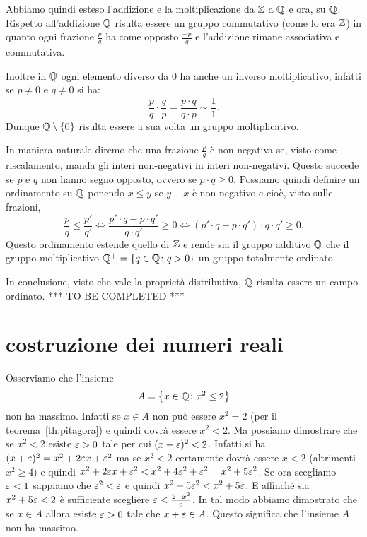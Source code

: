 Abbiamo quindi esteso l'addizione e la moltiplicazione da ${\mathbb Z}$ a ${\mathbb Q}$
e ora, su ${\mathbb Q}$.
Rispetto all'addizione ${\mathbb Q}$ risulta essere un gruppo commutativo (come lo era ${\mathbb Z}$)
in quanto ogni frazione $\frac{p}{q}$ ha come opposto $\frac{-p}{q}$ 
e l'addizione rimane associativa e commutativa.

Inoltre in ${\mathbb Q}$ ogni elemento diverso da $0$
ha anche un inverso moltiplicativo, infatti se $p\neq 0$ e $q\neq 0$ si ha:
\[
 \frac{p}{q}\cdot \frac{q}{p} = \frac{p\cdot q}{q\cdot p} \sim \frac{1}{1}.  
\]
Dunque ${\mathbb Q}\setminus{\left\{ 0 \right\}}$ risulta essere a sua volta un gruppo 
moltiplicativo.

In maniera naturale diremo che una frazione $\frac{p}{q}$ è non-negativa 
se, visto come riscalamento, manda gli interi non-negativi in interi non-negativi. 
Questo succede se $p$ e $q$ non hanno segno opposto, ovvero se $p\cdot q\ge 0$.
Possiamo quindi definire un ordinamento su ${\mathbb Q}$ 
ponendo $x\le y$ se $y-x$ è non-negativo e cioè, visto sulle frazioni,
\[
 \frac{p}{q} \le \frac{p'}{q'} \iff \frac{p'\cdot q-p\cdot q'}{q\cdot q'}\ge 0 
 \iff (p'\cdot q-p\cdot q')\cdot q\cdot q' \ge 0. 
\]
Questo ordinamento estende quello di ${\mathbb Z}$ e rende sia il gruppo additivo ${\mathbb Q}$
che il gruppo moltiplicativo ${\mathbb Q}^+ = {\left\{ q\in {\mathbb Q}\colon q>0 \right\}}$
un gruppo totalmente ordinato. 

In conclusione, visto che vale la proprietà distributiva,  
${\mathbb Q}$ risulta essere un campo ordinato. 
*** TO BE COMPLETED ***


\section{costruzione dei numeri reali}
\label{sec:costruzione_reali}

Osserviamo che l'insieme 
\[
 A = {\left\{ x\in {\mathbb Q} \colon x^2 \le 2 \right\}}  
\]
non ha massimo. 
Infatti se $x\in A$ non può essere $x^2=2$ (per il teorema~\ref{th:pitagora})
e quindi dovrà essere $x^2<2$. 
Ma possiamo dimostrare che se $x^2<2$ esiste $\varepsilon>0$ tale per cui $(x+\varepsilon)^2<2$. 
Infatti si ha $(x+\varepsilon)^2 = x^2 + 2\varepsilon x + \varepsilon^2$
ma se $x^2<2$ certamente dovrà essere $x<2$ (altrimenti $x^2\ge 4$)
e quindi $x^2+2\varepsilon x+\varepsilon^2 < x^2+ 4\varepsilon^2+\varepsilon^2 = x^2+5\varepsilon^2$.
Se ora scegliamo $\varepsilon<1$ sappiamo che $\varepsilon^2<\varepsilon$ 
e quindi $x^2+5\varepsilon^2 < x^2 + 5\varepsilon$. 
E affinché sia $x^2 + 5\varepsilon < 2$ è sufficiente scegliere 
$\varepsilon < \frac{2-x^2}{5}$. 
In tal modo abbiamo dimostrato che se $x\in A$ allora esiste 
$\varepsilon>0$ tale che $x+\varepsilon \in A$. 
Questo significa che l'insieme $A$ non ha massimo.

